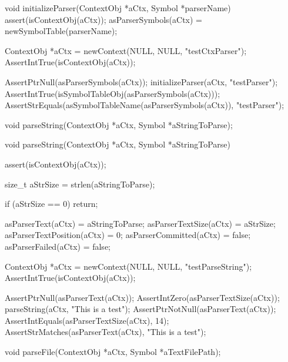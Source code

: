 \startCCode
void initializeParser(ContextObj *aCtx, Symbol *parserName) {
  assert(isContextObj(aCtx));
  asParserSymbols(aCtx) = newSymbolTable(parserName);
}
\stopCCode


\startCTest
  ContextObj *aCtx = newContext(NULL, NULL, "testCtxParser");
  AssertIntTrue(isContextObj(aCtx));
  
  AssertPtrNull(asParserSymbols(aCtx));
  initializeParser(aCtx, "testParser");
  AssertIntTrue(isSymbolTableObj(asParserSymbols(aCtx)));
  AssertStrEquals(asSymbolTableName(asParserSymbols(aCtx)), "testParser");
\stopCTest
\stopTestCase
\stopTestSuite


\startTestSuite[parseString]

\startCHeader
void parseString(ContextObj *aCtx, Symbol *aStringToParse);
\stopCHeader

\startCCode
void parseString(ContextObj *aCtx, Symbol *aStringToParse) {
  assert(isContextObj(aCtx));
  
  size_t aStrSize = strlen(aStringToParse);
  
  if (aStrSize == 0) return;
  
  asParserText(aCtx)         = aStringToParse;
  asParserTextSize(aCtx)     = aStrSize;
  asParserTextPosition(aCtx) = 0;
  asParserCommitted(aCtx)    = false;
  asParserFailed(aCtx)       = false;
}
\stopCCode


\startCTest
  ContextObj *aCtx = newContext(NULL, NULL, "testParseString");
  AssertIntTrue(isContextObj(aCtx));
  
  AssertPtrNull(asParserText(aCtx));
  AssertIntZero(asParserTextSize(aCtx));
  parseString(aCtx, "This is a test");
  AssertPtrNotNull(asParserText(aCtx));
  AssertIntEquals(asParserTextSize(aCtx), 14);
  AssertStrMatches(asParserText(aCtx), "This is a test");
\stopCTest
\stopTestCase
\stopTestSuite

\startTestSuite[parseFile]

\startCHeader
void parseFile(ContextObj *aCtx, Symbol *aTextFilePath);
\stopCHeader

